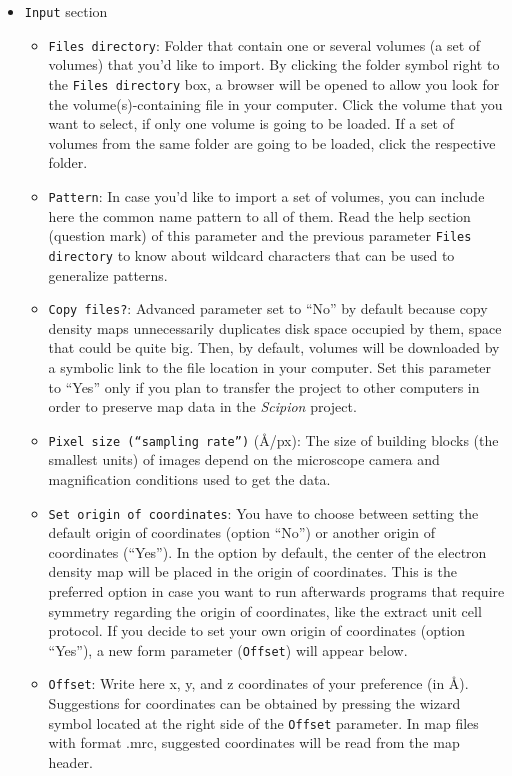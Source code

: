 \documentclass[12pt, draft]{article} %
\def\scipion{\textit{Scipion}\xspace}
\newcommand{\ttt}[1]{\texttt{#1}}
\begin{document}
\begin{appendices}
\begin{itemize}
  \begin{itemize}
   \item \ttt{Input} section\\
  

  \begin{itemize}
   \item \ttt{Files directory}: Folder that contain one or several volumes (a set of volumes) that you'd like to import. By clicking the folder symbol right to the \ttt{Files directory} box, a browser will be opened to allow you look for the volume(s)-containing file in your computer. Click the volume that you want to select, if only one volume is going to be loaded. If a set of volumes from the same folder are going to be loaded, click the respective folder.\\
   \item \ttt{Pattern}: In case you'd like to import a set of volumes, you can include here the common name pattern to all of them. Read the help section (question mark) of this parameter and the previous parameter \ttt{Files directory} to know about wildcard characters that can be used to generalize patterns.\\
   \item \ttt{Copy files?}: Advanced parameter set to ``No'' by default because copy density maps unnecessarily duplicates disk space occupied by them, space that could be quite big. Then, by default, volumes will be downloaded by a symbolic link to the file location in your computer. Set this parameter to ``Yes'' only if you plan to transfer the project to other computers in order to preserve map data in the \scipion project.\\
   \item \ttt{Pixel size (``sampling rate'')} (\AA/px): The size of building blocks (the smallest units) of images depend on the microscope camera and magnification conditions used to get the data.\\
   \item \ttt{Set origin of coordinates}: You have to choose between setting the default origin of coordinates (option ``No'') or another origin of coordinates (``Yes''). In the option by default, the center of the electron density map will be placed in the origin of coordinates. This is the preferred option in case you want to run afterwards programs that require symmetry regarding the origin of coordinates, like the extract unit cell protocol. If you decide to set your own origin of coordinates (option ``Yes''), a new form parameter (\ttt{Offset}) will appear below.\\
   \item \ttt{Offset}: Write here x, y, and z coordinates of your preference (in \AA). Suggestions for coordinates can be obtained by pressing the wizard symbol located at the right side of the \ttt{Offset} parameter. In map files with format .mrc, suggested coordinates will be read from the map header.\\
   \end{itemize}
   

\end{itemize}
\end{itemize}
\end{appendices}
\end{document}
